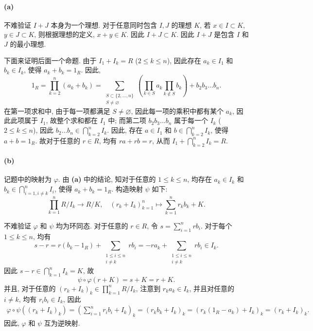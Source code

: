 \documentclass{article}
\begin{document}
\begin{solution}
	\paragraph{(a)} 不难验证 $I+J$ 本身为一个理想. 对于任意同时包含 $I, J$ 的理想 $K$, 若 $x \in I \subset K$, $y \in J \subset K$, 则根据理想的定义, $x + y \in K$. 因此 $I + J \subset K$. 因此 $I + J$ 是包含 $I$ 和 $J$ 的最小理想.

	下面来证明后面一个命题. 由于 $I_1 + I_k = R$ ($2 \le k \le n$), 因此存在 $a_k \in I_1$ 和 $b_k \in I_k$, 使得 $a_k + b_k = 1_R$. 因此, 
	\[ 1_R = \prod_{k=2}^{n}(a_k + b_k) = \sum_{\substack{S \subset \{2,\dots,n\} \\ S \neq \varnothing}}^{}\left( \prod_{k \in S}^{}a_k \prod_{k \notin S}^{}b_k \right) + b_2b_3 \dots b_n. \]
	在第一项求和中, 由于每一项都满足 $S \neq \varnothing$, 因此每一项的乘积中都有某个 $a_k$, 因此此项属于 $I_1$, 故整个求和都在 $I_1$ 中; 而第二项 $b_2b_3\dots b_n$ 属于每一个 $I_k$ ($2 \le k \le n$), 因此 $b_2 \dots b_n \in \bigcap_{k=2}^{n}I_k$. 因此, 存在 $a \in I_1$ 和 $b \in \bigcap_{k=2}^{n}I_k$, 使得 $a + b = 1_R$. 故对于任意的 $r \in R$, 均有 $ra + rb = r$, 从而 $I_1 + \bigcap_{k=2}^{n}I_k = R$.

	\paragraph{(b)} 记题中的映射为 $\varphi$. 由 \textbf{(a)} 中的结论, 知对于任意的 $1 \le k \le n$, 均存在 $a_k \in I_k$ 和 $b_k \in \bigcap_{i=1, i \neq k}^{n}I_i$, 使得 $a_k + b_k = 1_R$. 构造映射 $\psi$ 如下: 
	\[ \prod_{k=1}^{n}R/I_k \to R/K, \quad 
	(r_k + I_k)_{k=1}^{n} \mapsto \sum_{k=1}^{n}r_kb_k + K. \]

	不难验证 $\varphi$ 和 $\psi$ 均为环同态. 对于任意的 $r \in R$, 令 $s = \sum_{i=1}^{n}rb_i$. 对于每个 $1 \le k \le n$, 均有
	\[ s-r = r(b_k-1_R) + \sum_{\substack{1 \le i \le n \\ i \neq k}}rb_i = -ra_k + \sum_{\substack{1 \le i \le n \\ i \neq k}}rb_i \in I_k. \]
	因此 $s-r \in \bigcap_{k=1}^{n}I_k = K$, 故
	\[ \psi \circ \varphi(r+K) = s+K = r+K. \]
	并且, 对于任意的 $(r_k + I_k)_k \in \prod_{k=1}^{n}R/I_k$, 注意到 $r_ka_k \in I_k$, 并且对任意的 $i \neq k$, 均有 $r_ib_i \in I_k$, 因此
	\begin{align*}
		\varphi \circ \psi((r_k + I_k)_k) = \left( \sum_{i=1}^{n} r_i b_i + I_k \right)_k = \left( r_kb_k + I_k \right)_k = (r_k(1_R - a_k) + I_k)_k = (r_k + I_k)_k.
	\end{align*}
	因此, $\varphi$ 和 $\psi$ 互为逆映射.


\end{solution}
\end{document}
